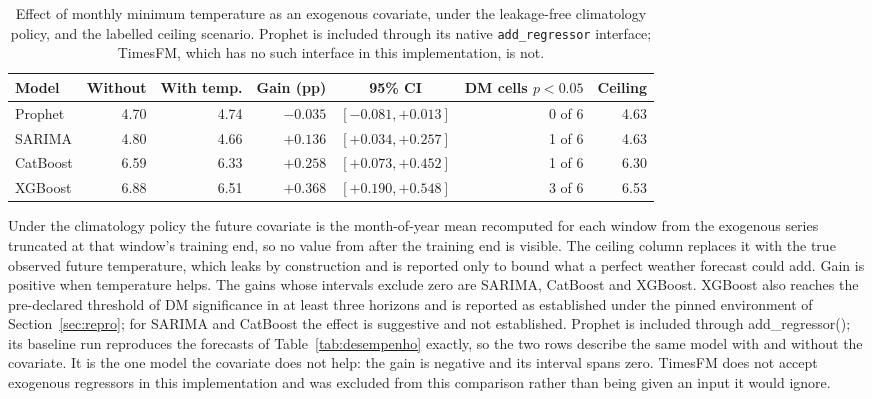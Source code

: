 \begin{table}[htbp]
\centering
\small
\setlength{\tabcolsep}{4pt}
\caption{Effect of monthly minimum temperature as an exogenous covariate, under the
leakage-free climatology policy, and the labelled ceiling scenario. Prophet is
included through its native \texttt{add\_regressor} interface; TimesFM, which has
no such interface in this implementation, is not.}
\label{tab:temperatura}
\begin{tabular}{lrrrcrr}
\toprule
Model & Without & With temp. & Gain (pp) & 95\% CI & DM cells $p<0.05$ & Ceiling \\
\midrule
Prophet & 4.70 & 4.74 & $-0.035$ & $[-0.081, +0.013]$ & 0 of 6 & 4.63 \\
SARIMA & 4.80 & 4.66 & $+0.136$ & $[+0.034, +0.257]$ & 1 of 6 & 4.63 \\
CatBoost & 6.59 & 6.33 & $+0.258$ & $[+0.073, +0.452]$ & 1 of 6 & 6.30 \\
XGBoost & 6.88 & 6.51 & $+0.368$ & $[+0.190, +0.548]$ & 3 of 6 & 6.53 \\
\bottomrule
\end{tabular}

\vspace{0.5em}
\begin{minipage}{\textwidth}
\footnotesize
Under the climatology policy the future covariate is the month-of-year mean recomputed
for each window from the exogenous series truncated at that window's training end, so no
value from after the training end is visible. The ceiling column replaces it with the
true observed future temperature, which leaks by construction and is reported only to
bound what a perfect weather forecast could add. Gain is positive when temperature helps.
The gains whose intervals exclude zero are SARIMA, CatBoost and XGBoost. XGBoost also reaches the pre-declared threshold of DM significance in at least three horizons and is reported as established under the pinned environment of Section~\ref{sec:repro}; for SARIMA and CatBoost the effect is suggestive and not established. Prophet is included through add\_regressor(); its baseline run reproduces the forecasts of Table~\ref{tab:desempenho} exactly, so the two rows describe the same model with and without the covariate. It is the one model the covariate does not help: the gain is negative and its interval spans zero.
TimesFM does not accept exogenous regressors in this implementation and was excluded from
this comparison rather than being given an input it would ignore.
\end{minipage}
\end{table}
